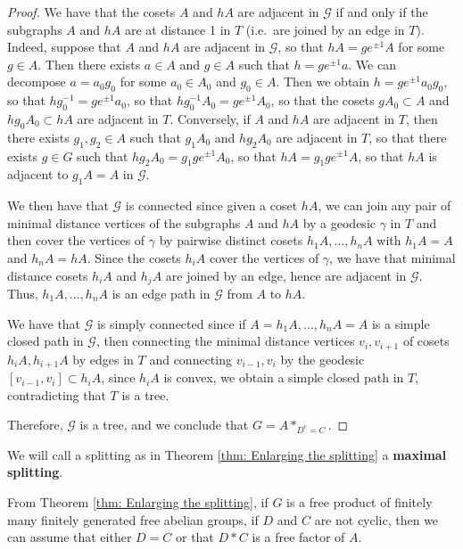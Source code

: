 \documentclass{amsart}
\theoremstyle{plain}
\theoremstyle{definition}
\theoremstyle{remark}
\begin{document}
\begin{proof}
    
    We have that the cosets $A$ and $hA$ are adjacent in $\mathcal{G}$ if and only if the subgraphs $A$ and $hA$ are at distance 1 in $T$ (i.e.\ are joined by an edge in $T$). Indeed, suppose that $A$ and $hA$ are adjacent in $\mathcal{G}$, so that $hA = g e^{\pm1}A$ for some $g \in A$. Then there exists $a \in A$ and $g \in A$ such that $h = g e^{\pm 1} a$. We can decompose $a = a_0 g_0 $ for some $a_0 \in A_0$ and $g_0 \in A$. Then we obtain $h = g e^{\pm 1} a_0 g_0$, so that $h g_0^{-1} = g e^{\pm 1}a_0$, so that $hg_0^{-1}A_0 = g e^{\pm 1}A_0$, so that the cosets $gA_0 \subset A$ and $hg_0 A_0 \subset hA$ are adjacent in $T$. Conversely, if $A$ and $hA$ are adjacent in $T$, then there exists $g_1,g_2 \in A$ such that $g_1 A_0$ and $hg_2 A_0$ are adjacent in $T$, so that there exists $g \in G$ such that $hg_2A_0 = g_1 ge^{\pm 1}A_0$, so that $hA = g_1 g e^{\pm 1}A$, so that $hA$ is adjacent to $g_1A=A$ in $\mathcal{G}$. 

    We then have that $\mathcal{G}$ is connected since given a coset $hA$, we can join any pair of minimal distance vertices of the subgraphs $A$ and $hA$ by a geodesic $\gamma$ in $T$ and then cover the vertices of $\gamma$ by pairwise distinct cosets $h_1 A, \ldots, h_nA$ with $h_1 A=A$ and $h_nA=hA$. Since the cosets $h_i A$ cover the vertices of $\gamma$, we have that minimal distance cosets $h_iA$ and $h_jA$ are joined by an edge, hence are adjacent in $\mathcal{G}$. Thus, $h_1A, \ldots, h_n A$ is an edge path in $\mathcal{G}$ from $A$ to $hA$. 

    We have that $\mathcal{G}$ is simply connected since if $A=h_1 A, \ldots, h_nA=A$ is a simple closed path in $\mathcal{G}$, then connecting the minimal distance vertices $v_i, v_{i+1}$ of cosets $h_iA, h_{i+1}A$ by edges in $T$ and connecting $v_{i-1}, v_i$ by the geodesic $[v_{i-1},v_i] \subset h_iA$, since $h_i A$ is convex, we obtain a simple closed path in $T$, contradicting that $T$ is a tree. 

    Therefore, $\mathcal{G}$ is a tree, and we conclude that $G = A*_{D^e=C}$.
\end{proof}

We will call a splitting as in Theorem \ref{thm: Enlarging the splitting} a \textbf{maximal splitting}.

From Theorem \ref{thm: Enlarging the splitting}, if $G$ is a free product of finitely many finitely generated free abelian groups, if $D$ and $C$ are not cyclic, then we can assume that either $D = C$ or that $D*C$ is a free factor of $A$. 
\end{document}
